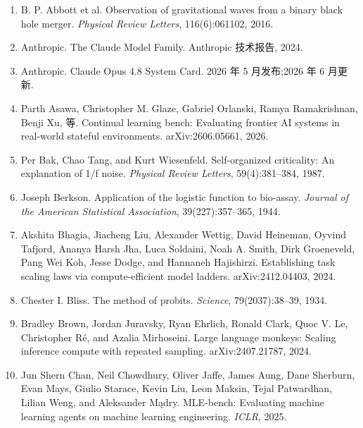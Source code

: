 \begingroup
\sloppy
\small
\setlength{\parindent}{0pt}
\setlength{\parskip}{0.4em}

\begin{enumerate}\itemsep0.4em

\item B. P. Abbott et al. Observation of gravitational waves from a binary black hole merger. \textit{Physical Review Letters}, 116(6):061102, 2016.

\item Anthropic. The Claude Model Family. Anthropic 技术报告, 2024.

\item Anthropic. Claude Opus 4.8 System Card. 2026 年 5 月发布;2026 年 6 月更新.

\item Parth Asawa, Christopher M. Glaze, Gabriel Orlanski, Ramya Ramakrishnan, Benji Xu, 等. Continual learning bench: Evaluating frontier AI systems in real-world stateful environments. arXiv:2606.05661, 2026.

\item Per Bak, Chao Tang, and Kurt Wiesenfeld. Self-organized criticality: An explanation of 1/f noise. \textit{Physical Review Letters}, 59(4):381--384, 1987.

\item Joseph Berkson. Application of the logistic function to bio-assay. \textit{Journal of the American Statistical Association}, 39(227):357--365, 1944.

\item Akshita Bhagia, Jiacheng Liu, Alexander Wettig, David Heineman, Oyvind Tafjord, Ananya Harsh Jha, Luca Soldaini, Noah A. Smith, Dirk Groeneveld, Pang Wei Koh, Jesse Dodge, and Hannaneh Hajishirzi. Establishing task scaling laws via compute-efficient model ladders. arXiv:2412.04403, 2024.

\item Chester I. Bliss. The method of probits. \textit{Science}, 79(2037):38--39, 1934.

\item Bradley Brown, Jordan Juravsky, Ryan Ehrlich, Ronald Clark, Quoc V. Le, Christopher R\'e, and Azalia Mirhoseini. Large language monkeys: Scaling inference compute with repeated sampling. arXiv:2407.21787, 2024.

\item Jun Shern Chan, Neil Chowdhury, Oliver Jaffe, James Aung, Dane Sherburn, Evan Mays, Giulio Starace, Kevin Liu, Leon Maksin, Tejal Patwardhan, Lilian Weng, and Aleksander M\k{a}dry. MLE-bench: Evaluating machine learning agents on machine learning engineering. \textit{ICLR}, 2025.


\end{enumerate}
